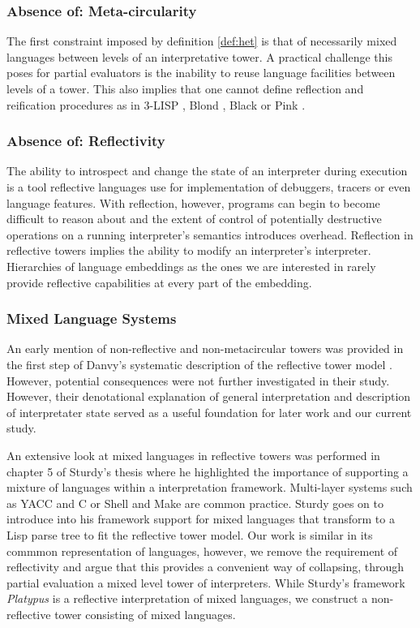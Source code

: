 \documentclass[fleqn]{article}
\theoremstyle{definition}
\begin{document}
\subsubsection{Absence of: Meta-circularity}
The first constraint imposed by definition \ref{def:het} is that of necessarily mixed languages between levels of an interpretative tower. A practical challenge this poses for partial evaluators is the inability to reuse language facilities between levels of a tower. This also implies that one cannot define reflection and reification procedures as in 3-LISP \cite{smith1984reflection}, Blond \cite{danvy1988intensions}, Black \cite{asai1996duplication} or Pink \cite{amin2017collapsing}.

\subsubsection{Absence of: Reflectivity}
The ability to introspect and change the state of an interpreter during execution is a tool reflective languages use for implementation of debuggers, tracers or even language features. With reflection, however, programs can begin to become difficult to reason about and the extent of control of potentially destructive operations on a running interpreter's semantics introduces overhead. Reflection in reflective towers implies the ability to modify an interpreter's interpreter. Hierarchies of language embeddings as the ones we are interested in rarely provide reflective capabilities at every part of the embedding.

\subsubsection{Mixed Language Systems}
An early mention of non-reflective and non-metacircular towers was provided in the first step of Danvy's systematic description of the reflective tower model \cite{danvy1988intensions}. However, potential consequences were not further investigated in their study. However, their denotational explanation of general interpretation and description of interpretater state served as a useful foundation for later work and our current study.

An extensive look at mixed languages in reflective towers was performed in chapter 5 of Sturdy's thesis \cite{sturdy1993lisp} where he highlighted the importance of supporting a mixture of languages within a interpretation framework. Multi-layer systems such as YACC and C or Shell and Make are common practice. Sturdy goes on to introduce into his framework support for mixed languages that transform to a Lisp parse tree to fit the reflective tower model. Our work is similar in its commmon representation of languages, however, we remove the requirement of reflectivity and argue that this provides a convenient way of collapsing, through partial evaluation a mixed level tower of interpreters. While Sturdy's framework \textit{Platypus} is a reflective interpretation of mixed languages, we construct a non-reflective tower consisting of mixed languages.
\end{document}
